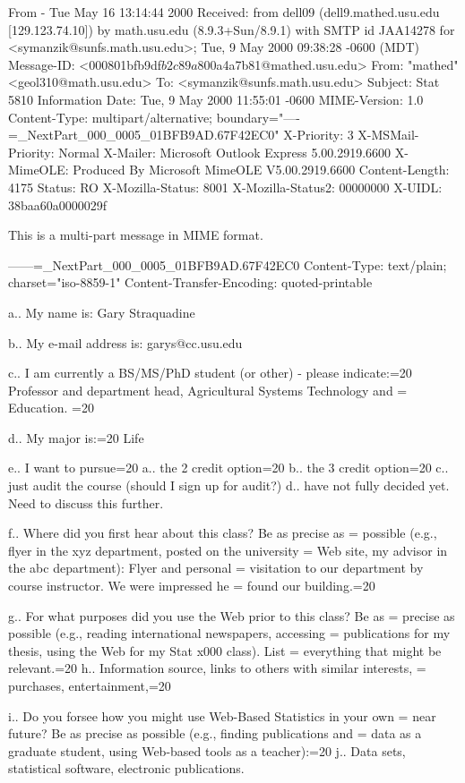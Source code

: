 From - Tue May 16 13:14:44 2000
Received: from dell09 (dell9.mathed.usu.edu [129.123.74.10])
	by math.usu.edu (8.9.3+Sun/8.9.1) with SMTP id JAA14278
	for <symanzik@sunfs.math.usu.edu>; Tue, 9 May 2000 09:38:28 -0600 (MDT)
Message-ID: <000801bfb9df$b2c89a80$0a4a7b81@mathed.usu.edu>
From: "mathed" <geol310@math.usu.edu>
To: <symanzik@sunfs.math.usu.edu>
Subject: Stat 5810 Information
Date: Tue, 9 May 2000 11:55:01 -0600
MIME-Version: 1.0
Content-Type: multipart/alternative;
	boundary="----=_NextPart_000_0005_01BFB9AD.67F42EC0"
X-Priority: 3
X-MSMail-Priority: Normal
X-Mailer: Microsoft Outlook Express 5.00.2919.6600
X-MimeOLE: Produced By Microsoft MimeOLE V5.00.2919.6600
Content-Length: 4175
Status: RO
X-Mozilla-Status: 8001
X-Mozilla-Status2: 00000000
X-UIDL: 38baa60a0000029f

This is a multi-part message in MIME format.

------=_NextPart_000_0005_01BFB9AD.67F42EC0
Content-Type: text/plain;
	charset="iso-8859-1"
Content-Transfer-Encoding: quoted-printable

  a.. My name is: Gary Straquadine


  b.. My e-mail address is: garys@cc.usu.edu


  c.. I am currently a BS/MS/PhD student (or other) - please indicate:=20
  Professor and department head, Agricultural Systems Technology and =
Education.   =20

  d.. My major is:=20
  Life

  e.. I want to pursue=20
    a.. the 2 credit option=20
    b.. the 3 credit option=20
    c.. just audit the course (should I sign up for audit?)
    d.. have not fully decided yet. Need to discuss this further.


  f.. Where did you first hear about this class? Be as precise as =
possible (e.g., flyer in the xyz department, posted on the university =
Web site, my advisor in the abc department): Flyer and personal =
visitation to our department by course instructor.  We were impressed he =
found our building.=20


  g.. For what purposes did you use the Web prior to this class? Be as =
precise as possible (e.g., reading international newspapers, accessing =
publications for my thesis, using the Web for my Stat x000 class). List =
everything that might be relevant.=20
  h.. Information source, links to others with similar interests, =
purchases, entertainment,=20


  i.. Do you forsee how you might use Web-Based Statistics in your own =
near future? Be as precise as possible (e.g., finding publications and =
data as a graduate student, using Web-based tools as a teacher):=20
  j.. Data sets, statistical software, electronic publications.


